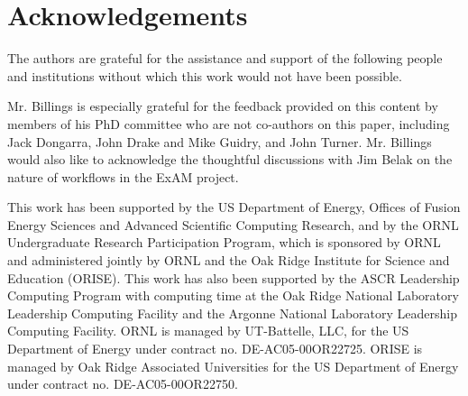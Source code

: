 \section{Acknowledgements}
The authors are grateful for the assistance and support of the following people
and institutions without which this work would not have been possible.

Mr. Billings is especially grateful for the feedback provided on this content by members of his PhD committee who are not co-authors on this paper, including Jack Dongarra, John Drake and Mike Guidry, and John Turner. Mr. Billings would also like to acknowledge the thoughtful discussions with Jim Belak on the nature of workflows in the ExAM project.

This work has been supported by the US Department of Energy, Offices of Fusion
Energy Sciences and Advanced Scientific Computing Research, and by the ORNL
Undergraduate Research Participation Program, which is sponsored by ORNL and
administered jointly by ORNL and the Oak Ridge Institute for Science and
Education (ORISE). This work has also been supported by the ASCR Leadership
Computing Program with computing time at the Oak Ridge National Laboratory
Leadership Computing Facility and the Argonne National Laboratory Leadership
Computing Facility. ORNL is managed by UT-Battelle, LLC, for the US Department
of Energy under contract no. DE-AC05-00OR22725. ORISE is managed by Oak Ridge
Associated Universities for the US Department of Energy under contract no.
DE-AC05-00OR22750.
